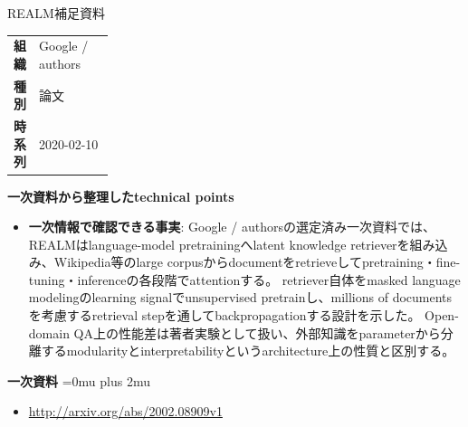 \begin{technicalnote}{REALM}{補足資料}
\begingroup
\begin{tabularx}{\linewidth}{@{}>{\bfseries}p{0.22\linewidth}X@{}}
組織 & Google / authors \\
種別 & 論文 \\
時系列 & 2020-02-10 \\
\end{tabularx}
\smallskip
{\bfseries 一次資料から整理したtechnical points}
\begin{itemize}[leftmargin=1.5em,itemsep=0.35em]
\item \textbf{一次情報で確認できる事実}: Google / authorsの選定済み一次資料では、REALMはlanguage-model pretrainingへlatent knowledge retrieverを組み込み、Wikipedia等のlarge corpusからdocumentをretrieveしてpretraining・fine-tuning・inferenceの各段階でattentionする。 retriever自体をmasked language modelingのlearning signalでunsupervised pretrainし、millions of documentsを考慮するretrieval stepを通してbackpropagationする設計を示した。 Open-domain QA上の性能差は著者実験として扱い、外部知識をparameterから分離するmodularityとinterpretabilityというarchitecture上の性質と区別する。
\end{itemize}
\begin{minipage}{\linewidth}
\begin{samepage}
{\bfseries 一次資料}
\begingroup\sloppy
\Urlmuskip=0mu plus 2mu\relax
\begin{itemize}[leftmargin=1.5em,itemsep=0.25em]
\item {\scriptsize\url{http://arxiv.org/abs/2002.08909v1}}
\end{itemize}
\endgroup
\end{samepage}
\end{minipage}
\endgroup
\end{technicalnote}
\medskip

